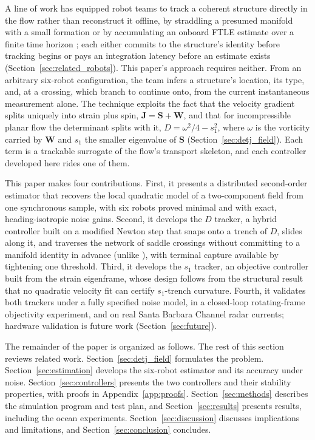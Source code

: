 \documentclass[lettersize,journal]{IEEEtran}
\begin{document}
A line of work has equipped robot teams to track a coherent structure
directly in the flow rather than reconstruct it offline, by straddling
a presumed manifold with a small formation \cite{9,10,11,12} or by
accumulating an onboard FTLE estimate over a finite time horizon
\cite{13}; each either commits to the structure's identity before
tracking begins or pays an integration latency before an estimate
exists (Section~\ref{sec:related_robots}). This paper's approach
requires neither. From an arbitrary six-robot configuration, the team
infers a structure's location, its type, and, at a crossing, which
branch to continue onto, from the current instantaneous measurement
alone. The technique exploits the fact that the velocity gradient
splits uniquely into strain plus spin, $\mathbf{J} = \mathbf{S} +
\mathbf{W}$, and that for incompressible planar flow the determinant
splits with it, $D = \omega^2/4 - s_1^2$, where $\omega$ is the
vorticity carried by $\mathbf{W}$ and $s_1$ the smaller eigenvalue of
$\mathbf{S}$ (Section~\ref{sec:detj_field}). Each term is a trackable
surrogate of the flow's transport skeleton, and each controller
developed here rides one of them.

This paper makes four contributions. First, it presents a distributed
second-order estimator that recovers the local quadratic model of a
two-component field from one synchronous sample, with six robots proved
minimal and with exact, heading-isotropic noise gains. Second, it
develops the $D$ tracker, a hybrid controller built on a modified
Newton step that snaps onto a trench of $D$, slides along it, and
traverses the network of saddle crossings without committing to a
manifold identity in advance (unlike \cite{9,10}), with terminal
capture available by tightening one threshold. Third, it develops the
$s_1$ tracker, an objective controller built from the strain
eigenframe, whose design follows from the structural result that no
quadratic velocity fit can certify $s_1$-trench curvature. Fourth, it
validates both trackers under a fully specified noise model, in a
closed-loop rotating-frame objectivity experiment, and on real Santa
Barbara Channel radar currents; hardware validation is future work
(Section~\ref{sec:future}).

The remainder of the paper is organized as follows. The rest of this
section reviews related work. Section~\ref{sec:detj_field} formulates
the problem. Section~\ref{sec:estimation} develops the six-robot
estimator and its accuracy under noise. Section~\ref{sec:controllers}
presents the two controllers and their stability properties, with
proofs in Appendix~\ref{app:proofs}. Section~\ref{sec:methods}
describes the simulation program and test plan, and
Section~\ref{sec:results} presents results, including the ocean
experiments. Section~\ref{sec:discussion} discusses implications and
limitations, and Section~\ref{sec:conclusion} concludes.
\end{document}
